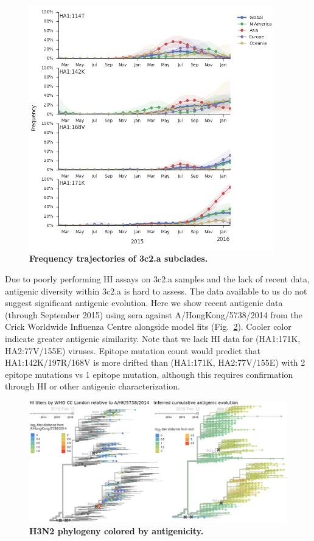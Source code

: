 \documentclass[11pt,oneside,letterpaper]{article}
\begin{document}
\begin{figure}[h!]
	\centering		
	\includegraphics[width=0.95\textwidth]{../figures/feb-2016/H3N2_mutations.png}
	\caption{\textbf{Frequency trajectories of 3c2.a subclades.} 
	}
	\label{H3N2_mutations}
\end{figure}

\pagebreak

Due to poorly performing HI assays on 3c2.a samples and the lack of recent data, antigenic diversity within 3c2.a is hard to assess. The data available to us do not suggest significant antigenic evolution. Here we show recent antigenic data (through September 2015) using sera against A/HongKong/5738/2014 from the Crick Worldwide Influenza Centre alongside model fits \cite{neher2015prediction} (Fig.\ \ref{H3N2_HI}). Cooler color indicate greater antigenic similarity. Note that we lack HI data for (HA1:171K, HA2:77V/155E) viruses. Epitope mutation count would predict that HA1:142K/197R/168V is more drifted than (HA1:171K, HA2:77V/155E) with 2 epitope mutations vs 1 epitope mutation, although this requires confirmation through HI or other antigenic characterization.

\begin{figure}[h!]
	\centering		
	\includegraphics[width=1.0\textwidth]{../figures/feb-2016/H3N2_HI.png}
	\caption{\textbf{H3N2 phylogeny colored by antigenicity.} 
	}
	\label{H3N2_HI}
\end{figure}
\end{document}

